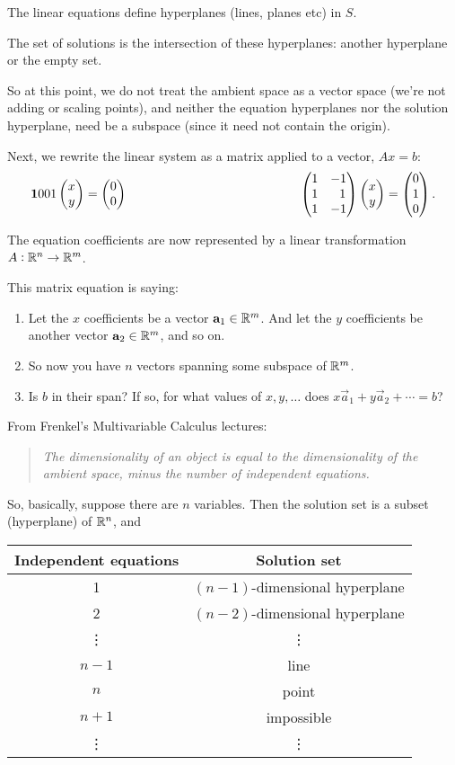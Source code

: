 The linear equations define hyperplanes (lines, planes etc) in $S$.

The set of solutions is the intersection of these hyperplanes: another
hyperplane or the empty set.

So at this point, we do not treat the ambient space as a vector space (we're
not adding or scaling points), and neither the equation hyperplanes nor the
solution hyperplane, need be a subspace (since it need not contain the origin).

Next, we rewrite the linear system as a matrix applied to a vector, $Ax = b$:
\begin{align*}
  \begin{array}{cc}
    \mathbf{1}{0}
        {0}{1} \begin{pmatrix}x\\y\end{pmatrix} = \begin{pmatrix}0\\0\end{pmatrix}
    ~~~~~~~~~~~~~~~~~~~~~~~~~~~~~~~~~~~~~~~&
    \begin{pmatrix}1 & -1\\1 & ~~1\\1 & -1\\ \end{pmatrix} \begin{pmatrix}x\\y\end{pmatrix} = \begin{pmatrix}0\\1\\0\end{pmatrix}.
  \end{array}
\end{align*}

The equation coefficients are now represented by a linear transformation
$A:\mathbb{R}^n \to \mathbb{R}^m$.

This matrix equation is saying:
\begin{enumerate}
\item Let the $x$ coefficients be a vector $\mathbf a_1 \in  \mathbb{R}^m$. And let the $y$
  coefficients be another vector $\mathbf a_2 \in  \mathbb{R}^m$, and so on.
\item So now you have $n$ vectors spanning some subspace of $\mathbb{R}^m$.
\item Is $b$ in their span? If so, for what values of $x, y, \ldots$ does
  $x\vec a_1 + y\vec a_2 + \cdots = b$?
\end{enumerate}

From Frenkel's Multivariable Calculus lectures:

\begin{center}
  \begin{quote}
    \textit{The dimensionality of an object is equal to the dimensionality of the
      ambient space, minus the number of independent equations.}
  \end{quote}
\end{center}

So, basically, suppose there are $n$ variables. Then the solution set is a
subset (hyperplane) of $\mathbb{R}^n$, and

\begin{tabular}{c|c}
  Independent equations & Solution set\\
  \hline
  1                     & $(n - 1)$-dimensional hyperplane \\
  2                     & $(n - 2)$-dimensional hyperplane \\
  \vdots                & \vdots \\
  $n-1$                 & line \\
  $n$                   & point \\
  $n + 1$               & impossible \\
  \vdots                & \vdots
\end{tabular}

